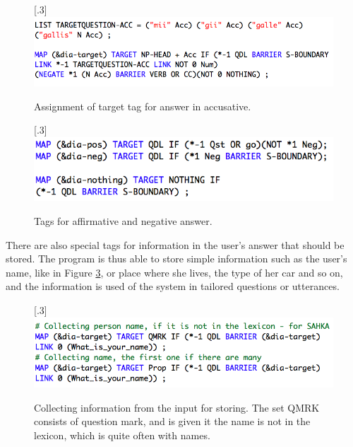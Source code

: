 \documentclass[11pt]{article}
\begin{document}
\begin{figure}[htbp]
\begin{center}
\scalebox{.3}[.3]{\includegraphics{presentation/img/target_acc.png}}\\
\caption{Assignment of target tag for answer in accusative. 
}
\label{targettag}
\end{center}
\end{figure}

\begin{figure}[htbp]
\begin{center}
\scalebox{.3}[.3]{\includegraphics{presentation/img/aff_or_neg_colours.png}}\\
\caption{Tags for affirmative and negative answer. 
}
\label{afforneg}
\end{center}
\end{figure}


There are also special tags for information in the user's answer that should be stored. The program is thus able to store simple information such as the user's name, like in Figure \ref{nametag}, or place where she lives, the type of her car and so on, and the information is used of the system in tailored questions or utterances.

\begin{figure}[htbp]
\begin{center}
\scalebox{.3}[.3]{\includegraphics{presentation/img/picking_name_new.png}}\\
\caption{Collecting information from the input for storing. The set QMRK consists of question mark, and is given it the name is not in the lexicon, which is quite often with names. 
}
\label{nametag}
\end{center}
\end{figure}
\end{document}

